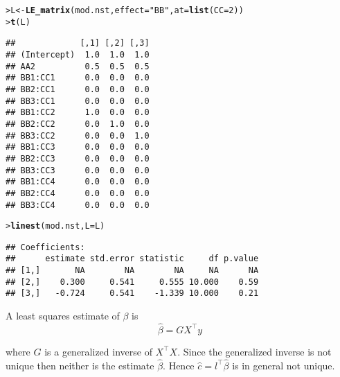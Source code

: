\documentclass[11pt]{article}\usepackage[]{graphicx}\usepackage[]{color}
\makeatletter
\newcommand{\hlnum}[1]{\textcolor[rgb]{0.686,0.059,0.569}{#1}}%
\newcommand{\hlstr}[1]{\textcolor[rgb]{0.192,0.494,0.8}{#1}}%
\newcommand{\hlstd}[1]{\textcolor[rgb]{0.345,0.345,0.345}{#1}}%
\newcommand{\hlkwb}[1]{\textcolor[rgb]{0.69,0.353,0.396}{#1}}%
\newcommand{\hlkwc}[1]{\textcolor[rgb]{0.333,0.667,0.333}{#1}}%
\newcommand{\hlkwd}[1]{\textcolor[rgb]{0.737,0.353,0.396}{\textbf{#1}}}%
\newenvironment{kframe}{%
 \def\at@end@of@kframe{}%
 \ifinner\ifhmode%
  \def\at@end@of@kframe{\end{minipage}}%
  \begin{minipage}{\columnwidth}%
 \fi\fi%
 \def\FrameCommand##1{\hskip\@totalleftmargin \hskip-\fboxsep
 \colorbox{shadecolor}{##1}\hskip-\fboxsep
     \hskip-\linewidth \hskip-\@totalleftmargin \hskip\columnwidth}%
 \MakeFramed {\advance\hsize-\width
   \@totalleftmargin\z@ \linewidth\hsize
   \@setminipage}}%
 {\par\unskip\endMakeFramed%
 \at@end@of@kframe}
\newenvironment{knitrout}{}{} %
\renewenvironment{knitrout}{
  \begin{oldknitrout}
    \footnotesize
    \topsep=0pt
}{
  \end{oldknitrout}
}
\newcommand{\transp}{^{\top}}
\makeatother
\begin{document}
\begin{knitrout}
\color{fgcolor}\begin{kframe}
\begin{alltt}
\hlstd{> }\hlstd{L} \hlkwb{<-} \hlkwd{LE_matrix}\hlstd{(mod.nst,} \hlkwc{effect}\hlstd{=}\hlstr{"BB"}\hlstd{,} \hlkwc{at}\hlstd{=}\hlkwd{list}\hlstd{(}\hlkwc{CC}\hlstd{=}\hlnum{2}\hlstd{))}
\hlstd{> }\hlkwd{t}\hlstd{(L)}
\end{alltt}
\begin{verbatim}
##             [,1] [,2] [,3]
## (Intercept)  1.0  1.0  1.0
## AA2          0.5  0.5  0.5
## BB1:CC1      0.0  0.0  0.0
## BB2:CC1      0.0  0.0  0.0
## BB3:CC1      0.0  0.0  0.0
## BB1:CC2      1.0  0.0  0.0
## BB2:CC2      0.0  1.0  0.0
## BB3:CC2      0.0  0.0  1.0
## BB1:CC3      0.0  0.0  0.0
## BB2:CC3      0.0  0.0  0.0
## BB3:CC3      0.0  0.0  0.0
## BB1:CC4      0.0  0.0  0.0
## BB2:CC4      0.0  0.0  0.0
## BB3:CC4      0.0  0.0  0.0
\end{verbatim}
\begin{alltt}
\hlstd{> }\hlkwd{linest}\hlstd{(mod.nst,} \hlkwc{L}\hlstd{=L)}
\end{alltt}
\begin{verbatim}
## Coefficients:
##      estimate std.error statistic     df p.value
## [1,]       NA        NA        NA     NA      NA
## [2,]    0.300     0.541     0.555 10.000    0.59
## [3,]   -0.724     0.541    -1.339 10.000    0.21
\end{verbatim}
\end{kframe}
\end{knitrout}

A least squares estimate of $\beta$ is
\begin{displaymath}
  \hat \beta = G X\transp y
\end{displaymath}

where $G$ is a generalized inverse of $X\transp  X$. Since the
generalized inverse is not unique then neither is the estimate
$\hat\beta$. Hence $\hat c = l\transp\hat \beta$ is in general not
unique.
\end{document}
